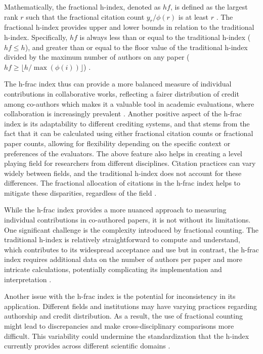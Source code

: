 Mathematically, the fractional h-index, denoted as $hf$, is defined as the
largest rank $r$ such that the fractional citation count $y_r/\phi(r)$ is at
least $r$ \cite{egghe2008mathematical}. The fractional h-index provides upper
and lower bounds in relation to the traditional h-index. Specifically, $hf$ is
always less than or equal to the traditional h-index ($hf \leq h$), and greater
than or equal to the floor value of the traditional h-index divided by the
maximum number of authors on any paper ($hf \geq \lfloor h / \max(\phi(i))
    \rfloor$) \cite{egghe2008mathematical}.

The h-frac index thus can provide a more balanced measure of individual
contributions in collaborative works, reflecting a fairer distribution of
credit among co-authors which makes it a valuable tool in academic evaluations,
where collaboration is increasingly prevalent
\cite{egghe2008mathematical,singhal2023analysis}. Another positive aspect of
the h-frac index is its adaptability to different crediting systems, and that
stems from the fact that it can be calculated using either fractional citation
counts or fractional paper counts, allowing for flexibility depending on the
specific context or preferences of the evaluators. The above feature also helps
in creating a level playing field for researchers from different disciplines.
Citation practices can vary widely between fields, and the traditional h-index
does not account for these differences. The fractional allocation of citations
in the h-frac index helps to mitigate these disparities, regardless of the
field \cite{singhal2023analysis}.

While the h-frac index provides a more nuanced approach to measuring individual
contributions in co-authored papers, it is not without its limitations. One
significant challenge is the complexity introduced by fractional counting. The
traditional h-index is relatively straightforward to compute and understand,
which contributes to its widespread acceptance and use but in contrast, the
h-frac index requires additional data on the number of authors per paper and
more intricate calculations, potentially complicating its implementation and
interpretation \cite{egghe2008mathematical,singhal2023analysis}.

Another issue with the h-frac index is the potential for inconsistency in its
application. Different fields and institutions may have varying practices
regarding authorship and credit distribution. As a result, the use of
fractional counting might lead to discrepancies and make cross-disciplinary
comparisons more difficult. This variability could undermine the
standardization that the h-index currently provides across different scientific
domains \cite{egghe2008mathematical,singhal2023analysis}.


